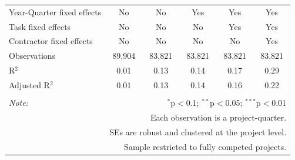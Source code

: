 \documentclass[]{article}
\begin{document}
\begin{table}[H]
\begin{tabular}{@{\extracolsep{-2pt}}lccccc}
Year-Quarter fixed effects & No & No & Yes & Yes & Yes \\ 
Task fixed effects & No & No & No & Yes & Yes \\ 
Contractor fixed effects & No & No & No & No & Yes \\ 
Observations & 89,904 & 83,821 & 83,821 & 83,821 & 83,821 \\ 
R$^{2}$ & 0.01 & 0.13 & 0.14 & 0.17 & 0.29 \\ 
Adjusted R$^{2}$ & 0.01 & 0.13 & 0.14 & 0.16 & 0.22 \\ 
\hline 
\hline \\[-1.8ex] 
\textit{Note:}  & \multicolumn{5}{r}{$^{*}$p$<$0.1; $^{**}$p$<$0.05; $^{***}$p$<$0.01} \\ 
 & \multicolumn{5}{r}{Each observation is a project-quarter.} \\ 
 & \multicolumn{5}{r}{SEs are robust and clustered at the project level.} \\ 
 & \multicolumn{5}{r}{Sample restricted to fully competed projects.} \\ 
\end{tabular} 
\end{table}
\end{document}

